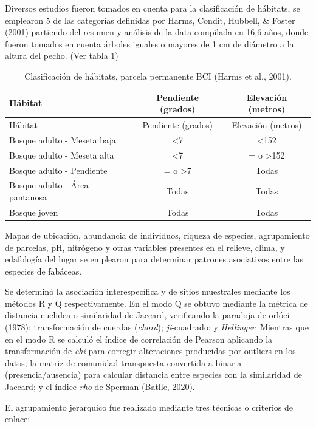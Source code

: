 \documentclass[11pt,]{article}
\begin{document}
Diversos estudios fueron tomados en cuenta para la clasificación de
hábitats, se emplearon 5 de las categorías definidas por Harms, Condit,
Hubbell, \& Foster (2001) partiendo del resumen y análisis de la data
compilada en 16,6 años, donde fueron tomados en cuenta árboles iguales o
mayores de 1 cm de diámetro a la altura del pecho. (Ver tabla
\ref{tab:hábitat})

\begin{longtable}[]{@{}lcc@{}}
\caption{Clasificación de hábitats, parcela permanente BCI (Harms et
al., 2001).\label{tab:hábitat}}\tabularnewline
\toprule
Hábitat & Pendiente (grados) & Elevación (metros)\tabularnewline
\midrule
\endfirsthead
\toprule
Hábitat & Pendiente (grados) & Elevación (metros)\tabularnewline
\midrule
\endhead
Bosque adulto - Meseta baja & \textless{}7 &
\textless{}152\tabularnewline
Bosque adulto - Meseta alta & \textless{}7 & = o
\textgreater{}152\tabularnewline
Bosque adulto - Pendiente & = o \textgreater{}7 & Todas\tabularnewline
Bosque adulto - Área pantanosa & Todas & Todas\tabularnewline
Bosque joven & Todas & Todas\tabularnewline
\bottomrule
\end{longtable}

Mapas de ubicación, abundancia de individuos, riqueza de especies,
agrupamiento de parcelas, pH, nitrógeno y otras variables presentes en
el relieve, clima, y edafología del lugar se emplearon para determinar
patrones asociativos entre las especies de fabáceas.

Se determinó la asociación interespecífica y de sitios muestrales
mediante los métodos R y Q respectivamente. En el modo Q se obtuvo
mediante la métrica de distancia euclidea o similaridad de Jaccard,
verificando la paradoja de orlóci (1978); transformación de cuerdas
(\emph{chord}); \emph{ji}-cuadrado; y \emph{Hellinger}. Mientras que en
el modo R se calculó el índice de correlación de Pearson aplicando la
transformación de \emph{chi} para corregir alteraciones producidas por
outliers en los datos; la matriz de comunidad transpuesta convertida a
binaria (presencia/ausencia) para calcular distancia entre especies con
la similaridad de Jaccard; y el índice \emph{rho} de Sperman (Batlle,
2020).

El agrupamiento jerarquico fue realizado mediante tres técnicas o
criterios de enlace:
\end{document}
